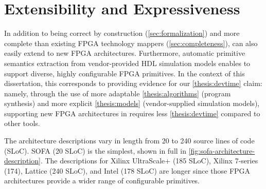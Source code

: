 

\section{\lr Extensibility and Expressiveness}

In addition to being
  correct by construction (\cref{sec:formalization}) and
  more complete 
  than existing FPGA technology mappers (\cref{sec:completeness}),
  \lr can also easily extend to new FPGA architectures.
Furthermore, automatic primitive semantics extraction 
  from vendor-provided HDL simulation models
  enables \lr to support diverse, highly configurable
  FPGA primitives.
In the context of this dissertation,
  this corresponds to providing evidence
  for our \cref{thesis:devtime} claim:
  namely,
  through the use of
   more adaptable \cref{thesis:algorithms}
  (program synthesis)
  and more explicit \cref{thesis:models}
  (vendor-supplied simulation models),
  supporting new FPGA architectures in
  \lr
  requires less \cref{thesis:devtime}
  compared to other tools.


The architecture descriptions
    vary in length from 20 to 240
    source lines of code (SLoC).
%
SOFA (20 SLoC) is the simplest, shown in full
  in \cref{fig:sofa-architecture-description}.
The descriptions for Xilinx UltraScale+ (185 SLoC), Xilinx 7-series (174),
  Lattice (240 SLoC), and Intel (178 SLoC)
  are longer since those
  FPGA architectures provide a
  wider range of configurable primitives.

